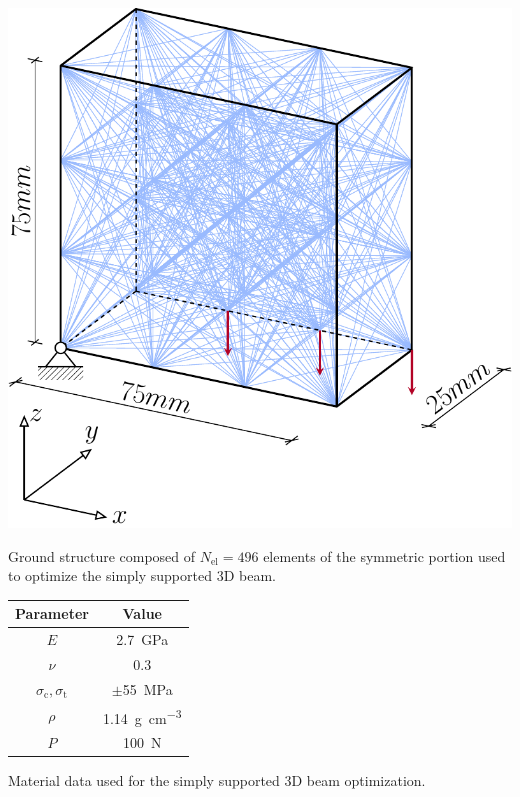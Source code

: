 \begin{marginfigure}
    \centering
    \includegraphics[width=\linewidth]{figures/04_TTO_improvements/15_supported_3D_BCs_symm/supported_3D_symm.pdf}
    \caption{Ground structure composed of $N_\text{el}=496$ elements of the symmetric portion used to optimize the simply supported 3D beam.}
    \label{fig:04_simply3D_BC_GS}
\end{marginfigure}

\begin{margintable}
    \small
    \centering
    \begin{tabular}{cc}
    \toprule
    \textbf{Parameter}        & \textbf{Value} \\ \midrule
    $E$              & \qty{2.7}{GPa}     \\
    $\nu$            & 0.3   \\
    $\sigma_\text{c}, \sigma_\text{t}$ & $\pm $\qty{55}{MPa} \\
    $\rho$              & \qty{1.14}{\gram\per\cubic\centi\metre}   \\
    $P$              & \qty{100}{N}   \\
    \bottomrule
    \end{tabular}
    \caption{Material data used for the simply supported 3D beam optimization.}
    \label{tab:04_3D_supp_mat}
\end{margintable}

